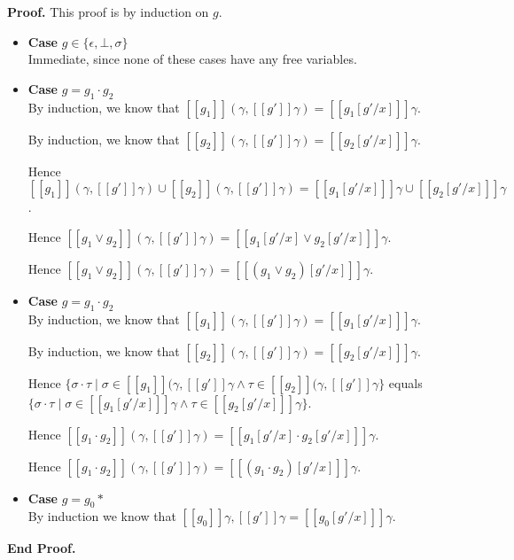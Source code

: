 \documentclass{article}
\newcommand{\interp}[1]{[\![{#1}]\!]}
\newcommand{\setof}[1]{\{{#1}\}}
\newcommand{\comprehend}[2]{\setof{{#1}\;|\;{#2}}}
\newenvironment{proof}{\noindent\textbf{Proof.}}{\noindent\textbf{End Proof.}}
\newenvironment{caseblock}{\begin{itemize}}{\end{itemize}}
\newenvironment{case}[1]{\item \textbf{Case} {#1}\\}{}
\begin{document}
\begin{proof}
  This proof is by induction on $g$. 

  \begin{caseblock}
    \begin{case}{$g \in \setof{\epsilon, \bot, \sigma}$}
      Immediate, since none of these cases have any free variables. 
    \end{case}

    \begin{case}{$g = g_1 \cdot g_2$}
      By induction, we know that $\interp{g_1}(\gamma, \interp{g'}\gamma) = \interp{g_1[g'/x]}\gamma$.

      By induction, we know that $\interp{g_2}(\gamma, \interp{g'}\gamma) = \interp{g_2[g'/x]}\gamma$.

      Hence $\interp{g_1}(\gamma, \interp{g'}\gamma) \cup \interp{g_2}(\gamma, \interp{g'}\gamma) = \interp{g_1[g'/x]}\gamma \cup \interp{g_2[g'/x]}\gamma$.

      Hence $\interp{g_1 \vee g_2}(\gamma, \interp{g'}\gamma) = \interp{g_1[g'/x] \vee g_2[g'/x]}\gamma$.

      Hence $\interp{g_1 \vee g_2}(\gamma, \interp{g'}\gamma) = \interp{(g_1 \vee g_2)[g'/x]}\gamma$.
    \end{case}

    \begin{case}{$g = g_1\cdot g_2$}
      By induction, we know that $\interp{g_1}(\gamma, \interp{g'}\gamma) = \interp{g_1[g'/x]}\gamma$.

      By induction, we know that $\interp{g_2}(\gamma, \interp{g'}\gamma) = \interp{g_2[g'/x]}\gamma$.

      Hence $\comprehend{\sigma\cdot\tau}{\sigma\in\interp{g_1}(\gamma, \interp{g'}\gamma \land \tau\in\interp{g_2}(\gamma, \interp{g'}\gamma}$ equals \\
      \noindent $\comprehend{\sigma\cdot\tau}{\sigma\in\interp{g_1[g'/x]}\gamma \land \tau\in\interp{g_2[g'/x]}\gamma}$.

      Hence $\interp{g_1\cdot g_2}(\gamma, \interp{g'}\gamma) = \interp{g_1[g'/x]\cdot g_2[g'/x]}\gamma$. 

      Hence $\interp{g_1\cdot g_2}(\gamma, \interp{g'}\gamma) = \interp{(g_1\cdot g_2)[g'/x]}\gamma$. 
    \end{case}

    \begin{case}{$g = g_0*$}
      By induction we know that $\interp{g_0}{\gamma, \interp{g'}\gamma} = \interp{g_0[g'/x]}\gamma$. 


\end{case}
\end{caseblock}
\end{proof}
\end{document}
